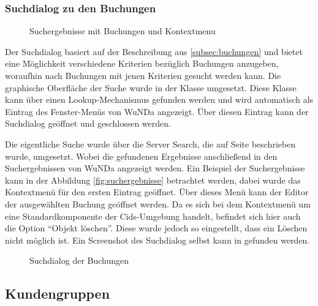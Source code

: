 \subsubsection{Suchdialog zu den Buchungen}
\begin{figure}[htbp]
	\centering
	\caption{Suchergebnisse mit Buchungen und Kontextmenu}
	\label{fig:suchergebnisse}
\end{figure}

Der Suchdialog basiert auf der Beschreibung aus \autoref{subsec:buchungen} und bietet eine Möglichkeit verschiedene Kriterien bezüglich Buchungen anzugeben, woraufhin nach Buchungen mit jenen Kriterien gesucht werden kann.
Die graphische Oberfläche der Suche wurde in der Klasse  umgesetzt.
Diese Klasse kann über einen Lookup-Mechanismus gefunden werden und wird automatisch als Eintrag des Fenster-Menüs von \ac{WuNDa} angezeigt.
Über diesen Eintrag kann der Suchdialog geöffnet und geschlossen werden.

Die eigentliche Suche wurde über die Server Search, die auf Seite \pageref{subsec:serversearch} beschrieben wurde, umgesetzt.
Wobei die gefundenen Ergebnisse  anschließend in den Suchergebnissen von \ac{WuNDa} angezeigt werden.
Ein Beispiel der Suchergebnisse kann in der Abbildung \vref{fig:suchergebnisse} betrachtet werden, dabei wurde das Kontextmenü für den ersten Eintrag geöffnet.
Über dieses Menü kann der Editor der ausgewählten Buchung geöffnet werden.
Da es sich bei dem Kontextmenü um eine Standardkomponente der Cids-Umgebung handelt, befindet sich hier auch die Option "`Objekt löschen"'.
Diese wurde jedoch so eingestellt, dass ein Löschen nicht möglich ist.
Ein Screenshot des Suchdialog selbst kann in  gefunden werden.

\begin{figure}[htbp]
	\centering
	\caption{Suchdialog der Buchungen}
	\label{fig:gui-suchdialog}
\end{figure}

\subsection{Kundengruppen}

